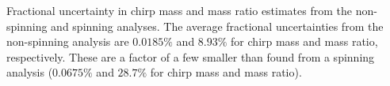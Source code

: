 \label{fig:mass_std} Fractional uncertainty in chirp mass and mass ratio estimates from the non-spinning and spinning analyses.  The average fractional uncertainties from the non-spinning analysis are $0.0185\%$ and $8.93\%$ for chirp mass and mass ratio, respectively.  These are a factor of a few smaller than found from a spinning analysis ($0.0675\%$ and $28.7\%$ for chirp mass and mass ratio).